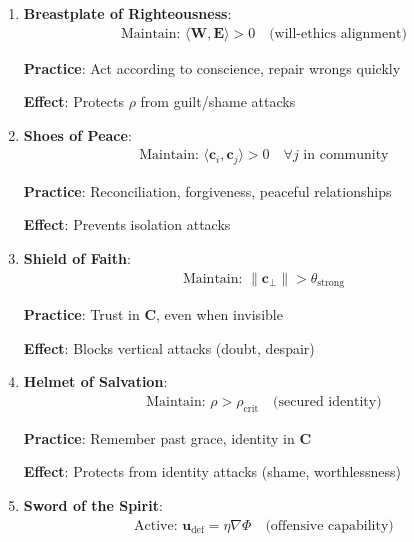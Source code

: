 \documentclass[11pt,a4paper]{article}
\theoremstyle{definition}
\theoremstyle{remark}
\newcommand{\EE}{\mathbf{E}}
\newcommand{\WW}{\mathbf{W}}
\newcommand{\cc}{\mathbf{c}}
\begin{document}
\begin{enumerate}
\begin{protocol}
\begin{enumerate}
        \textbf{Practice}: Daily reality-checking, reject lies/self-deception
        
        \textbf{Effect}: Prevents distortion attacks on \(\cc\)
    
    \item \textbf{Breastplate of Righteousness}:
        \begin{align}
        \text{Maintain: } \langle \WW, \EE \rangle > 0 \quad \text{(will-ethics alignment)}
        \end{align}
        
        \textbf{Practice}: Act according to conscience, repair wrongs quickly
        
        \textbf{Effect}: Protects \(\rho\) from guilt/shame attacks
    
    \item \textbf{Shoes of Peace}:
        \begin{align}
        \text{Maintain: } \langle \cc_i, \cc_j \rangle > 0 \quad \forall j \text{ in community}
        \end{align}
        
        \textbf{Practice}: Reconciliation, forgiveness, peaceful relationships
        
        \textbf{Effect}: Prevents isolation attacks
    
    \item \textbf{Shield of Faith}:
        \begin{align}
        \text{Maintain: } \|\cc_\perp\| > \theta_{\text{strong}}
        \end{align}
        
        \textbf{Practice}: Trust in \(\mathbf{C}\), even when invisible
        
        \textbf{Effect}: Blocks vertical attacks (doubt, despair)
    
    \item \textbf{Helmet of Salvation}:
        \begin{align}
        \text{Maintain: } \rho > \rho_{\text{crit}} \quad \text{(secured identity)}
        \end{align}
        
        \textbf{Practice}: Remember past grace, identity in \(\mathbf{C}\)
        
        \textbf{Effect}: Protects from identity attacks (shame, worthlessness)
    
    \item \textbf{Sword of the Spirit}:
        \begin{align}
        \text{Active: } \mathbf{u}_{\text{def}} = \eta \nabla \Phi \quad \text{(offensive capability)}
        \end{align}
        

\end{enumerate}
\end{protocol}
\end{enumerate}
\end{document}
